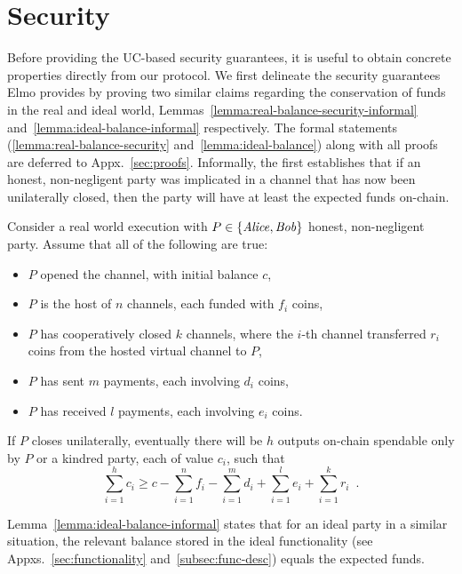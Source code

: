 \section{Security}
  \label{section:security}
    Before providing the UC-based security guarantees, it is useful to obtain
  concrete properties directly from our protocol. We first delineate the
  security guarantees Elmo provides by proving two similar claims regarding the
  conservation of funds in the real and ideal world,
  Lemmas~\ref{lemma:real-balance-security-informal}
  and~\ref{lemma:ideal-balance-informal} respectively. The formal statements
  (\ref{lemma:real-balance-security} and~\ref{lemma:ideal-balance}) along with
  all proofs are deferred
  to Appx.~\ref{sec:proofs}. Informally, the first
  establishes that if an honest, non-negligent party was implicated in a channel
  that has now been unilaterally closed,
  then the party will have at least the expected funds on-chain.

\begin{lemma}
\label{lemma:real-balance-security-informal}
  Consider a real world execution with $P \in \{\mathit{Alice}, \mathit{Bob}\}$ honest,
  non-negligent party. Assume that all of the following are true:
  \begin{itemize}
    \item $P$ opened the channel, with initial balance $c$,
    \item $P$ is the host of $n$ channels, each funded with $f_i$ coins,
    \item $P$ has cooperatively closed $k$ channels, where the $i$-th channel
    transferred $r_i$ coins from the hosted virtual channel to $P$,
    \item $P$ has sent $m$ payments, each involving $d_i$ coins,
    \item $P$ has received $l$ payments, each involving $e_i$ coins.
  \end{itemize}
  If $P$ closes unilaterally, eventually there will be $h$ outputs on-chain
  spendable only by $P$ or a kindred party, each of value $c_i$, such that
  \begin{equation}
    \sum\limits_{i=1}^h c_i \geq c - \sum\limits_{i=1}^n f_i -
    \sum\limits_{i=1}^m d_i + \sum\limits_{i=1}^l e_i + \sum\limits_{i=1}^k r_i
    \enspace.
  \end{equation}
\end{lemma}

  Lemma~\ref{lemma:ideal-balance-informal} states that for an ideal party in a
  similar situation, the relevant balance stored in the ideal functionality
  \fchan (see Appxs.~\ref{sec:functionality} and~\ref{subsec:func-desc}) equals
  the expected funds.

